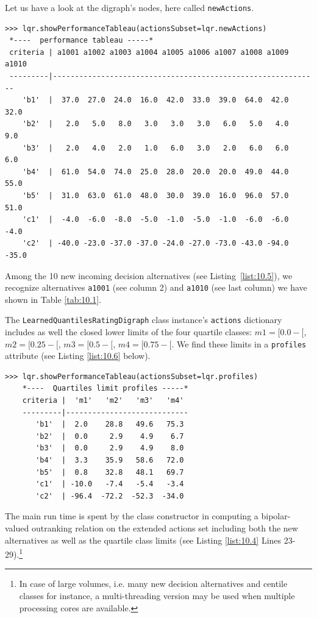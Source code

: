 Let us have a look at the digraph's nodes, here called \texttt{newActions}.
\begin{lstlisting}[caption={Performance tableau of the new incoming decision alternatives},label=list:10.5,basicstyle=\scriptsize]
>>> lqr.showPerformanceTableau(actionsSubset=lqr.newActions)
 *----  performance tableau -----*
 criteria | a1001 a1002 a1003 a1004 a1005 a1006 a1007 a1008 a1009 a1010   
 ---------|-------------------------------------------------------------
    'b1'  |  37.0  27.0  24.0  16.0  42.0  33.0  39.0  64.0  42.0  32.0  
    'b2'  |   2.0   5.0   8.0   3.0   3.0   3.0   6.0   5.0   4.0   9.0  
    'b3'  |   2.0   4.0   2.0   1.0   6.0   3.0   2.0   6.0   6.0   6.0  
    'b4'  |  61.0  54.0  74.0  25.0  28.0  20.0  20.0  49.0  44.0  55.0  
    'b5'  |  31.0  63.0  61.0  48.0  30.0  39.0  16.0  96.0  57.0  51.0  
    'c1'  |  -4.0  -6.0  -8.0  -5.0  -1.0  -5.0  -1.0  -6.0  -6.0  -4.0  
    'c2'  | -40.0 -23.0 -37.0 -37.0 -24.0 -27.0 -73.0 -43.0 -94.0 -35.0  
\end{lstlisting}
  Among the 10 new incoming decision alternatives (see Listing~\ref{list:10.5}), we recognize alternatives \texttt{a1001} (see column 2) and \texttt{a1010} (see last column) we have shown in Table \ref{tab:10.1}.

The \texttt{LearnedQuantilesRatingDigraph} class instance's \texttt{actions} dictionary includes as well the closed lower limits of the four quartile classes: $m1 = [0.0- [$, $m2 = [0.25- [$, $m3 = [0.5- [$, $m4 = [0.75 - [$. We find these limits in a \texttt{profiles} attribute (see Listing \ref{list:10.6} below).
\begin{lstlisting}[caption={Showing the limiting profiles of the rating quantiles},label=list:10.6]
>>> lqr.showPerformanceTableau(actionsSubset=lqr.profiles)
    *----  Quartiles limit profiles -----*
    criteria |  'm1'   'm2'   'm3'   'm4'   
    ---------|----------------------------
       'b1'  |  2.0    28.8   49.6   75.3  
       'b2'  |  0.0     2.9    4.9    6.7  
       'b3'  |  0.0     2.9    4.9    8.0  
       'b4'  |  3.3    35.9   58.6   72.0  
       'b5'  |  0.8    32.8   48.1   69.7  
       'c1'  | -10.0   -7.4   -5.4   -3.4  
       'c2'  | -96.4  -72.2  -52.3  -34.0  
\end{lstlisting}

The main run time is spent by the class constructor in computing a bipolar-valued outranking relation on the extended actions set including both the new alternatives as well as the quartile class limits (see Listing \ref{list:10.4} Lines 23-29).\footnote{In case of large volumes, i.e. many new decision alternatives and centile classes for instance, a multi-threading version may be used when multiple processing cores are available.}

